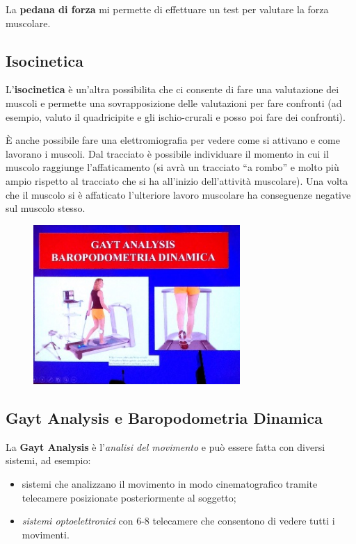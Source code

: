 La \textbf{pedana di forza} mi permette di effettuare un test per
valutare la forza muscolare.

\subsection{Isocinetica}


L'\textbf{isocinetica} è un'altra possibilita che ci consente di fare
una valutazione dei muscoli e permette una sovrapposizione delle
valutazioni per fare confronti (ad esempio, valuto il quadricipite e gli
ischio-crurali e posso poi fare dei confronti).

È anche possibile fare una elettromiografia per vedere come si attivano
e come lavorano i muscoli. Dal tracciato è possibile individuare il
momento in cui il muscolo raggiunge l'affaticamento (si avrà un
tracciato ``a rombo'' e molto più ampio rispetto al tracciato che si ha
all'inizio dell'attività muscolare). Una volta che il muscolo si è
affaticato l'ulteriore lavoro muscolare
ha conseguenze negative sul muscolo stesso.

\begin{figure}[!ht]
\centering
	\includegraphics[width=0.7\textwidth]{030/image14.jpeg}
\end{figure}
\subsection{Gayt Analysis e Baropodometria Dinamica}

La \textbf{Gayt Analysis} è l'\emph{analisi del movimento} e può essere
fatta con diversi sistemi, ad esempio:

\begin{itemize}
 
\item
  sistemi che analizzano il movimento in modo cinematografico tramite
  telecamere posizionate posteriormente al soggetto;
 
\item
  \emph{sistemi optoelettronici} con 6-8 telecamere che consentono di
  vedere tutti i movimenti.
\end{itemize}

